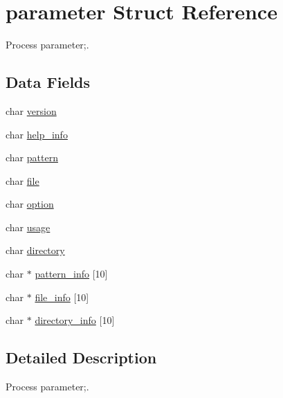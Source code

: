 \hypertarget{structparameter}{
\section{parameter Struct Reference}
\label{structparameter}
}


Process parameter;.  


\subsection*{Data Fields}
\begin{DoxyCompactItemize}
\item 
char \hyperlink{structparameter_a1ae211b923c0ca2de98c2a6b3ec4c6b1}{version}
\item 
char \hyperlink{structparameter_a1381e4a8fe53b36d133973f26e08cef4}{help\_\-info}
\item 
char \hyperlink{structparameter_a021dce247495584ddd423f072f04672c}{pattern}
\item 
char \hyperlink{structparameter_a4ecb9d8632a7871799de459d57e099ec}{file}
\item 
char \hyperlink{structparameter_a454fa9de3ca009e3082488412cd184d4}{option}
\item 
char \hyperlink{structparameter_a55fa74161839e8f2e73198c67ad074d7}{usage}
\item 
char \hyperlink{structparameter_a5d392da4ac3b837edcd0ea423f63ce60}{directory}
\item 
char $\ast$ \hyperlink{structparameter_a63ee2b43ba6b35b7de16d6d9da0b97e9}{pattern\_\-info} \mbox{[}10\mbox{]}
\item 
char $\ast$ \hyperlink{structparameter_ab8fcad04e42add1edf49b16b68b2585b}{file\_\-info} \mbox{[}10\mbox{]}
\item 
char $\ast$ \hyperlink{structparameter_adc4158a7ebdb2434c6fd85cc1110c226}{directory\_\-info} \mbox{[}10\mbox{]}
\end{DoxyCompactItemize}


\subsection{Detailed Description}
Process parameter;. 

